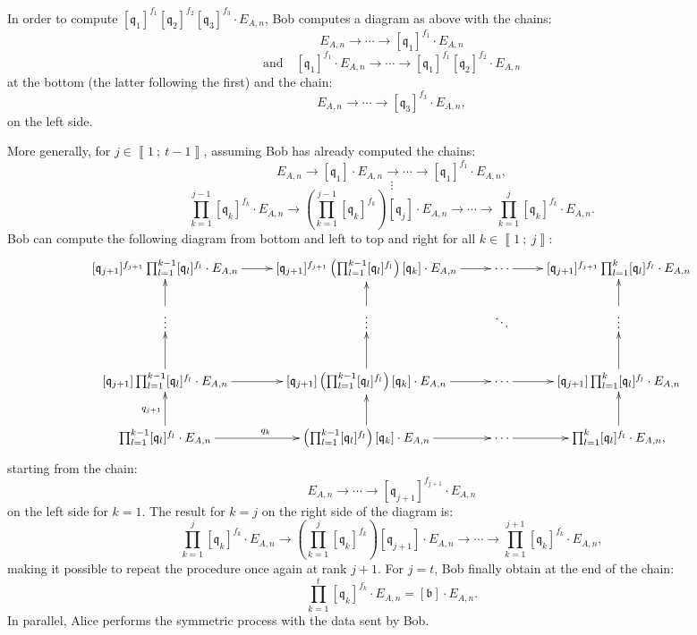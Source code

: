 \documentclass[a4paper,10pt]{report}
\theoremstyle{definition}
\theoremstyle{plain}
\theoremstyle{definition}
\renewcommand{\i}[2]{\left\llbracket #1~;~#2\right\rrbracket}
\renewcommand{\(}{\left(}
\renewcommand{\)}{\right)}
\newcommand{\mf}[1]{\mathfrak{#1}}
\newcommand{\mfq}{\mathfrak{q}}
\begin{document}
In order to compute $[\mf{q}_1]^{f_1}[\mf{q}_2]^{f_2}[\mf{q}_3]^{f_3}\cdot E_{A,n}$, Bob computes a diagram as above with the chains:
\[E_{A,n}\longrightarrow \cdots\longrightarrow [\mfq_1]^{f_1}\cdot E_{A,n}\]
\[\mbox{and} \quad [\mfq_1]^{f_1}\cdot E_{A,n}\longrightarrow \cdots\longrightarrow [\mfq_1]^{f_1}[\mf{q}_2]^{f_2}\cdot E_{A,n}\]
at the bottom (the latter following the first) and the chain:
\[E_{A,n}\longrightarrow \cdots\longrightarrow [\mfq_3]^{f_3}\cdot E_{A,n},\]
on the left side.

More generally, for $j\in\i{1}{t-1}$, assuming Bob has already computed the chains:
\[E_{A,n}\longrightarrow [\mf{q}_1]\cdot E_{A,n} \longrightarrow \cdots\longrightarrow [\mfq_1]^{f_1}\cdot E_{A,n},\]
\[\vdots\]
\[\prod_{k=1}^{j-1} [\mfq_k]^{f_k}\cdot E_{A,n}\longrightarrow \(\prod_{k=1}^{j-1} [\mfq_k]^{f_k}\)[\mf{q}_j]\cdot E_{A,n}\longrightarrow \cdots\longrightarrow \prod_{k=1}^{j} [\mfq_k]^{f_k}\cdot E_{A,n}.\]
Bob can compute the following diagram from bottom and left to top and right for all $k\in\i{1}{j}$:
\[\xymatrix{
[\mf{q}_{j+1}]^{f_{j+1}}\prod_{l=1}^{k-1} [\mfq_l]^{f_l} \cdot E_{A,n} \ar[r] & [\mf{q}_{j+1}]^{f_{j+1}}\(\prod_{l=1}^{k-1} [\mfq_l]^{f_l}\)[\mf{q}_{k}] \cdot E_{A,n}  \ar[r] & \cdots \ar[r] & [\mf{q}_{j+1}]^{f_{j+1}}\prod_{l=1}^{k} [\mfq_l]^{f_l} \cdot E_{A,n} \\
\vdots \ar[u] & \vdots \ar[u] & \ddots & \vdots \ar[u] \\
[\mf{q}_{j+1}]\prod_{l=1}^{k-1} [\mfq_l]^{f_l} \cdot E_{A,n} \ar[u] \ar[r] & [\mf{q}_{j+1}]\(\prod_{l=1}^{k-1} [\mfq_l]^{f_l}\)[\mf{q}_{k}] \cdot E_{A,n} \ar[u] \ar[r] & \cdots \ar[r] & [\mf{q}_{j+1}]\prod_{l=1}^{k} [\mfq_l]^{f_l} \cdot E_{A,n} \ar[u]\\
\prod_{l=1}^{k-1} [\mfq_l]^{f_l} \cdot E_{A,n} \ar[u]^{q_{j+1}} \ar[r]^{q_k} & \(\prod_{l=1}^{k-1} [\mfq_l]^{f_l}\)[\mf{q}_k] \cdot E_{A,n} \ar[u] \ar[r] & \cdots \ar[r] & \prod_{l=1}^{k} [\mfq_l]^{f_l} \cdot E_{A,n}, \ar[u]
}\]
starting from the chain:
\[E_{A,n}\longrightarrow \cdots\longrightarrow [\mfq_{j+1}]^{f_{j+1}}\cdot E_{A,n}\]
on the left side for $k=1$. The result for $k=j$ on the right side of the diagram is:
\[\prod_{k=1}^{j} [\mfq_k]^{f_k}\cdot E_{A,n}\longrightarrow \(\prod_{k=1}^{j} [\mfq_k]^{f_k}\)[\mf{q}_{j+1}]\cdot E_{A,n}\longrightarrow \cdots\longrightarrow \prod_{k=1}^{j+1} [\mfq_k]^{f_k}\cdot E_{A,n},\]
making it possible to repeat the procedure once again at rank $j+1$. For $j=t$, Bob finally obtain at the end of the chain:
\[\prod_{k=1}^{t} [\mfq_k]^{f_k}\cdot E_{A,n}=[\mf{b}]\cdot E_{A,n}.\]
In parallel, Alice performs the symmetric process with the data sent by Bob.
\end{document}
